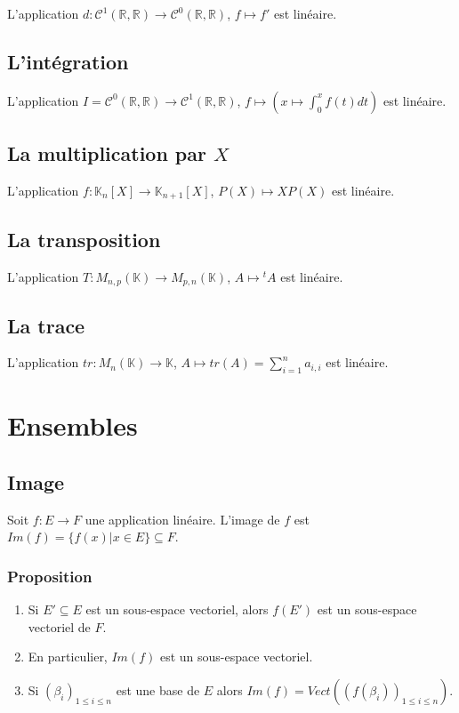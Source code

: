 \documentclass[a4paper,10pt]{book} %
\newcommand{\R}{\mathbb{R}}
\newcommand{\K}{\mathbb{K}}
\begin{document}
L'application $d:\mathcal{C}^1(\R,\R)\rightarrow \mathcal{C}^0(\R,\R)$, $f\mapsto f'$ est linéaire.

\subsection{L'intégration}
L'application $I=\mathcal{C}^0(\R,\R)\rightarrow \mathcal{C}^1(\R,\R)$, $f\mapsto(x\mapsto \displaystyle\int_{0}^{x}f(t)dt)$ est linéaire.

\subsection{La multiplication par $X$}
L'application $f:\K_n[X]\rightarrow \K_{n+1}[X]$, $P(X)\mapsto XP(X)$ est linéaire.

\subsection{La transposition}
L'application $T:M_{n,p}(\K)\rightarrow M_{p,n}(\K)$, $A\mapsto {}^tA$ est linéaire.

\subsection{La trace}
L'application $tr: M_n(\K)\rightarrow \K$, $A\mapsto tr(A)=\sum\limits_{i=1}^n a_{i,i}$ est linéaire.

\newpage

\section{Ensembles}
\subsection{Image}
Soit $f :E\rightarrow F$ une application linéaire. L'image de $f$ est $Im(f)=\{ f(x) | x\in E \} \subseteq F$.

\subsubsection{Proposition}
\begin{enumerate}
\item Si $E'\subseteq E$ est un sous-espace vectoriel, alors $f(E')$ est un sous-espace vectoriel de $F$.

\item En particulier, $Im(f)$ est un sous-espace vectoriel.

\item Si $(\beta_i)_{1\leq i\leq n}$ est une base de $E$ alors $Im(f)=Vect((f(\beta_i))_{1\leq i\leq n})$.
\end{enumerate}
\end{document}
